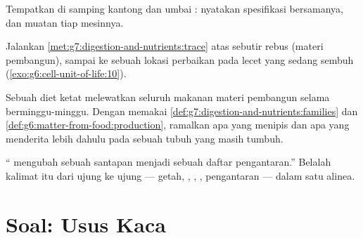 \begin{exercise}[$\star\star$]\label{exo:g7:digestion-and-nutrients:9}
Tempatkan  di samping kantong  dan umbai
: nyatakan spesifikasi bersamanya, dan muatan tiap mesinnya.
\end{exercise}

\begin{exercise}[$\star\star$]\label{exo:g7:digestion-and-nutrients:10}
Jalankan \cref{met:g7:digestion-and-nutrients:trace} atas sebutir
 rebus (materi pembangun), sampai ke sebuah lokasi perbaikan pada
lecet yang sedang sembuh (\cref{exo:g6:cell-unit-of-life:10}).
\end{exercise}

\begin{exercise}[$\star\star$]\label{exo:g7:digestion-and-nutrients:11}
Sebuah diet ketat melewatkan seluruh makanan materi pembangun selama
berminggu-minggu. Dengan memakai
\cref{def:g7:digestion-and-nutrients:families} dan
\cref{def:g6:matter-from-food:production}, ramalkan apa yang menipis
dan apa yang menderita lebih dahulu pada sebuah tubuh yang masih
tumbuh.
\end{exercise}

\begin{exercise}[$\star\star\star$]\label{exo:g7:digestion-and-nutrients:12}
`` mengubah sebuah santapan menjadi sebuah daftar
pengantaran.'' Belalah kalimat itu dari ujung ke ujung --- getah, , , , pengantaran --- dalam satu alinea.
\end{exercise}

\section{Soal: Usus Kaca}

